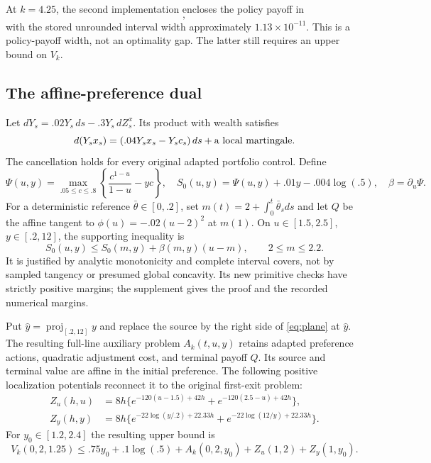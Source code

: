 At $k=4.25$, the second implementation encloses the policy payoff in
\begin{equation}
 [-1.315469674845588,\ -1.315469674834266],\label{eq:primalexample}
\end{equation}
with the stored unrounded interval width approximately $1.13\times10^{-11}$. This is a policy-payoff width, not an optimality gap. The latter still requires an upper bound on $V_k$.

\subsection{The affine-preference dual}
Let $dY_s=.02Y_s\,ds-.3Y_s\,dZ^x_s$. Its product with wealth satisfies
\[
 d(Y_sx_s)=(.04Y_sx_s-Y_sc_s)\,ds+\hbox{a local martingale}.
\]
The cancellation holds for every original adapted portfolio control. Define
\[
 \Psi(u,y)=\max_{.05\leq c\leq.8}\left\{\frac{c^{1-u}}{1-u}-yc\right\},\quad
 S_0(u,y)=\Psi(u,y)+.01y-.004\log(.5),\quad\beta=\partial_u\Psi.
\]
For a deterministic reference $\bar\theta\in[0,.2]$, set $m(t)=2+\int_0^t\bar\theta_sds$ and let $Q$ be the affine tangent to $\phi(u)=-.02(u-2)^2$ at $m(1)$. On $u\in[1.5,2.5]$, $y\in[.2,12]$, the supporting inequality is
\begin{equation}
 S_0(u,y)\leq S_0(m,y)+\beta(m,y)(u-m),\qquad 2\leq m\leq2.2.
 \label{eq:plane}
\end{equation}
It is justified by analytic monotonicity and complete interval covers, not by sampled tangency or presumed global concavity. Its new primitive checks have strictly positive margins; the supplement gives the proof and the recorded numerical margins.

Put $\widehat y=\operatorname{proj}_{[.2,12]}y$ and replace the source by the right side of \eqref{eq:plane} at $\widehat y$. The resulting full-line auxiliary problem $A_k(t,u,y)$ retains adapted preference actions, quadratic adjustment cost, and terminal payoff $Q$. Its source and terminal value are affine in the initial preference. The following positive localization potentials reconnect it to the original first-exit problem:
\begin{align}
 Z_u(h,u)&=8h\{e^{-120(u-1.5)+42h}+e^{-120(2.5-u)+42h}\},\label{eq:Zu}\\
 Z_y(h,y)&=8h\{e^{-22\log(y/.2)+22.33h}+e^{-22\log(12/y)+22.33h}\}.
 \label{eq:Zy}
\end{align}
For $y_0\in[1.2,2.4]$ the resulting upper bound is
\begin{equation}
 V_k(0,2,1.25)\leq .75y_0+.1\log(.5)+A_k(0,2,y_0)+Z_u(1,2)+Z_y(1,y_0).
 \label{eq:dual}
\end{equation}

